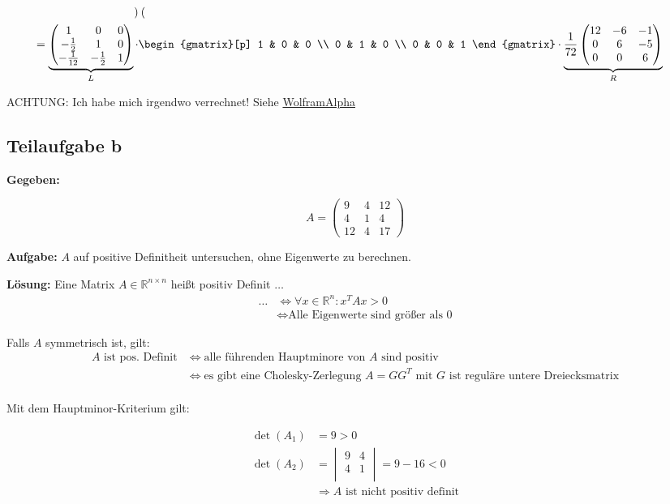 \begin{align}
\begin{pmatrix}
	\end{pmatrix}
	\\
  = \underbrace{\begin{pmatrix}
		          1 & 0 & 0 \\
	   -\frac{1}{2} & 1 & 0  \\
	   -\frac{1}{12} & - \frac{1}{2} & 1
	\end{pmatrix}}_L \cdot
	&\begin{gmatrix}[p]
		1 & 0 & 0 \\
		0 & 1 & 0 \\
		0 & 0 & 1
	\end{gmatrix}
	\cdot \underbrace{\frac{1}{72}
	\begin{pmatrix}
		          12 & -6 & -1 \\
	               0 &  6 & -5 \\
	               0 &  0 &  6
	\end{pmatrix}}_R
\end{align}

ACHTUNG: Ich habe mich irgendwo verrechnet!
Siehe \href{http://www.wolframalpha.com/input/?i=%7B%7B1%2C0%2C0%7D%2C%7B-1%2F2%2C1%2C0%7D%2C%7B-1%2F12%2C-1%2F2%2C1%7D%7D*%7B%7B12%2C-6%2C-1%7D%2C%7B0%2C6%2C-5%7D%2C%7B0%2C0%2C6%7D%7D}{WolframAlpha}

\subsection*{Teilaufgabe b}

\textbf{Gegeben:}

\[A = 
\begin{pmatrix}
    9 & 4 & 12 \\
    4 & 1  & 4 \\
   12 & 4  & 17
\end{pmatrix}\]

\textbf{Aufgabe:} $A$ auf positive Definitheit untersuchen, ohne Eigenwerte zu berechnen.

\textbf{Lösung:}
Eine Matrix $A \in \mathbb{R}^{n \times n}$ heißt positiv Definit $\dots$
\begin{align*}
  \dots & \Leftrightarrow \forall x \in \mathbb{R}^n: x^T A x > 0\\
	& \Leftrightarrow \text{Alle Eigenwerte sind größer als 0}
\end{align*}

Falls $A$ symmetrisch ist, gilt:
\begin{align*}
 \text{$A$ ist pos. Definit} & \Leftrightarrow \text{alle führenden Hauptminore von $A$ sind positiv}\\
	& \Leftrightarrow \text{es gibt eine Cholesky-Zerlegung $A=GG^T$ mit $G$ ist reguläre untere Dreiecksmatrix}\\
\end{align*}

Mit dem Hauptminor-Kriterium gilt:

\begin{align}
	\det(A_1) &= 9 > 0\\
	\det(A_2) &= 
		\begin{vmatrix}
			9 & 4 \\
			4 & 1 \\
		\end{vmatrix} = 9 - 16 < 0\\
	&\Rightarrow \text{$A$ ist nicht positiv definit}
\end{align}

